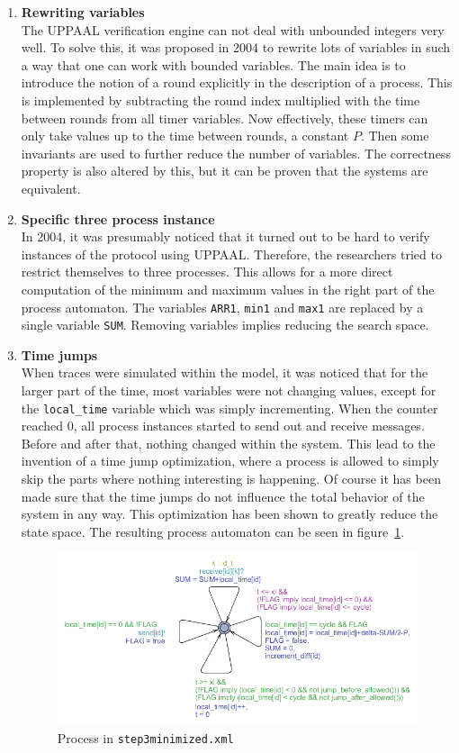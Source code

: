 \documentclass[a4paper,10pt]{article}
\newcommand{\UPPAAL}{UPPAAL\xspace}
\begin{document}
\begin{enumerate}
\item \textbf{Rewriting variables} \\
	The \UPPAAL verification engine can not deal with unbounded integers very well. To solve this, it was proposed in 2004 to rewrite lots of variables in such a way that one can work with bounded variables. The main idea is to introduce the notion of a round explicitly in the description of a process. This is implemented by subtracting the round index multiplied with the time between rounds from all timer variables. Now effectively, these timers can only take values up to the time between rounds, a constant \(P\). Then some invariants are used to further reduce the number of variables. The correctness property is also altered by this, but it can be proven that the systems are equivalent.

\item \textbf{Specific three process instance} \\
	In 2004, it was presumably noticed that it turned out to be hard to verify instances of the protocol using \UPPAAL. Therefore, the researchers tried to restrict themselves to three processes. This allows for a more direct computation of the minimum and maximum values in the right part of the process automaton. The variables \texttt{ARR1}, \texttt{min1} and \texttt{max1} are replaced by a single variable \texttt{SUM}. Removing variables implies reducing the search space.

\item \textbf{Time jumps} \\
	When traces were simulated within the model, it was noticed that for the larger part of the time, most variables were not changing values, except for the \texttt{local\_time} variable which was simply incrementing. When the counter reached 0, all process instances started to send out and receive messages. Before and after that, nothing changed within the system. This lead to the invention of a time jump optimization, where a process is allowed to simply skip the parts where nothing interesting is happening. Of course it has been made sure that the time jumps do not influence the total behavior of the system in any way. This optimization has been shown to greatly reduce the state space. The resulting process automaton can be seen in figure~\ref{fig:step3minimized_process}.

\begin{figure}[!h]
\includegraphics[width=\textwidth]{step3minimized_process}
\caption{Process in \texttt{step3minimized.xml}\label{fig:step3minimized_process}}
\end{figure}


\end{enumerate}
\end{document}
